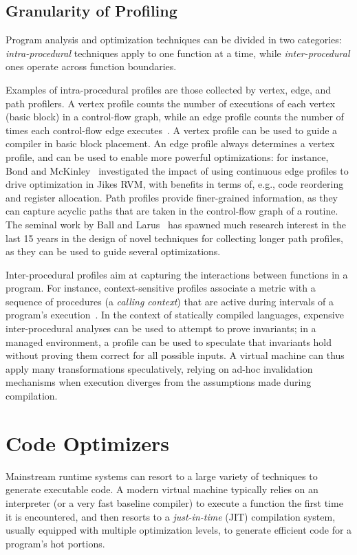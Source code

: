 \subsection*{Granularity of Profiling}

Program analysis and optimization techniques can be divided in two categories: {\em intra-procedural} techniques apply to one function at a time, while {\em inter-procedural} ones operate across function boundaries.

Examples of intra-procedural profiles are those collected by vertex, edge, and path profilers. A vertex profile counts the number of executions of each vertex (basic block) in a control-flow graph, while an edge profile counts the number of times each control-flow edge executes~\cite{Ball94}. A vertex profile can be used to guide a compiler in basic block placement. An edge profile always determines a vertex profile, and can be used to enable more powerful optimizations: for instance, Bond and McKinley~\cite{Bond05} investigated the impact of using continuous edge profiles to drive optimization in Jikes RVM, with benefits in terms of, e.g., code reordering and register allocation. Path profiles provide finer-grained information, as they can capture acyclic paths that are taken in the control-flow graph of a routine. The seminal work by Ball and Larus~\cite{Ball96} has spawned much research interest in the last 15 years in the design of novel techniques for collecting longer path profiles, as they can be used to guide several optimizations.

Inter-procedural profiles aim at capturing the interactions between functions in a program. For instance, context-sensitive profiles associate a metric with a sequence of procedures (a {\em calling context}) that are active during intervals of a program's execution~\cite{Ammons97}. In the context of statically compiled languages, expensive inter-procedural analyses can be used to attempt to prove invariants; in a managed environment, a profile can be used to speculate that invariants hold without proving them correct for all possible inputs. A virtual machine can thus apply many transformations speculatively, relying on ad-hoc invalidation mechanisms when execution diverges from the assumptions made during compilation.

\section{Code Optimizers}
Mainstream runtime systems can resort to a large variety of techniques to generate executable code. A modern virtual machine typically relies on an interpreter (or a very fast baseline compiler) to execute a function the first time it is encountered, and then resorts to a {\em just-in-time} (JIT) compilation system, usually equipped with multiple optimization levels, to generate efficient code for a program's hot portions.

